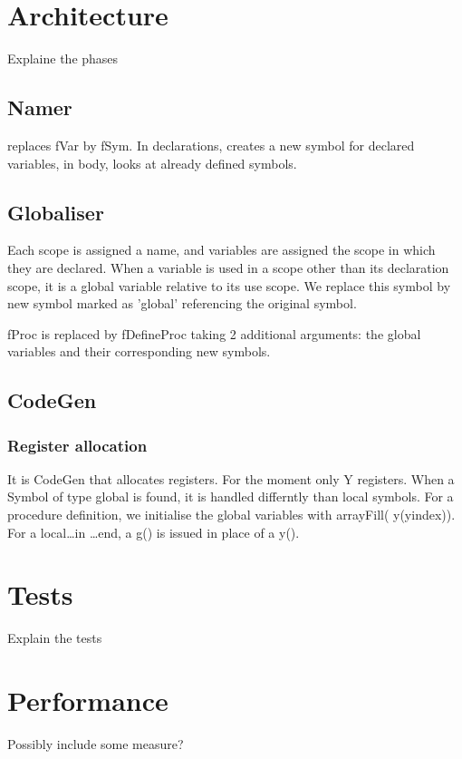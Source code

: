 \documentclass[draft,a4paper]{memoir}
\begin{document}
\section{Architecture}
Explaine the phases
\subsection{Namer}
replaces fVar by fSym. In declarations, creates a new symbol for declared variables, in body, looks at already defined symbols.
\subsection{Globaliser}
Each scope is assigned a name, and variables are assigned the scope in which they are declared. When a variable is used in a scope other than its declaration scope, it is a global variable relative to its use scope. We replace this symbol by new symbol marked as 'global' referencing the original symbol.

fProc is replaced by fDefineProc taking 2 additional arguments: the global variables and their corresponding new symbols. 
\subsection{CodeGen}
\subsubsection{Register allocation}
It is CodeGen that allocates registers. For the moment only Y registers.
When a Symbol of type global is found, it is handled differntly than local symbols.
For a procedure definition, we initialise the global variables with arrayFill( y(yindex)). 
For a local\ldots in \ldots end, a g() is issued in place of a y(). 

\section{Tests}
Explain the tests

\section{Performance}
Possibly include some measure?
\end{document}
